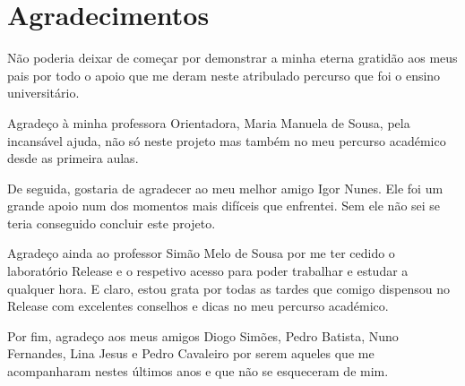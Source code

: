 \chapter*{Agradecimentos}
\label{ch::agradeco_primeiramente_a_deus}

Não poderia deixar de começar por demonstrar a minha eterna gratidão aos meus pais por todo o apoio que me deram neste atribulado percurso que foi o ensino universitário.

Agradeço à minha professora Orientadora, Maria Manuela de Sousa, pela incansável ajuda, não só neste projeto mas também no meu percurso académico desde as primeira aulas.

De seguida, gostaria de agradecer ao meu melhor amigo Igor Nunes. Ele foi um grande apoio num dos momentos mais difíceis que enfrentei. Sem ele não sei se teria conseguido concluir este projeto.

Agradeço ainda ao professor Simão Melo de Sousa por me ter cedido o laboratório \ac{Release} e o respetivo acesso para poder trabalhar e estudar a qualquer hora. E claro, estou grata por todas as tardes que comigo dispensou no \ac{Release} com excelentes conselhos e dicas no meu percurso académico.

Por fim, agradeço aos meus amigos Diogo Simões, Pedro Batista, Nuno Fernandes, Lina Jesus e Pedro Cavaleiro por serem aqueles que me acompanharam nestes últimos anos e que não se esqueceram de mim.

